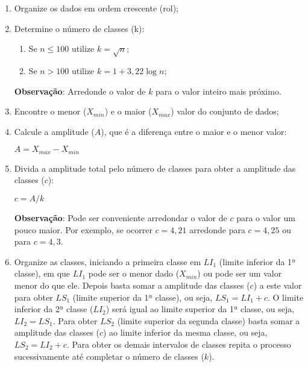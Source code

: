 \documentclass[11pt,fleqn]{book} %
\begin{document}
\begin{enumerate}
	\item Organize os dados em ordem crescente (rol); \\
	
	\item{Determine o número de classes (k):	
	\begin{enumerate}
		\item Se $n \leq 100$ utilize $k=\sqrt{n}$;
		\item Se $n>100$ utilize $k = 1+3,22 \log{n}$;
	\end{enumerate}
	{\bf Observação}: Arredonde o valor de $k$ para o valor inteiro mais próximo. \\
		}
		
	\item Encontre o menor ($X_{min}$) e o maior ($X_{max}$) valor do conjunto de dados; \\
	
	\item Calcule a amplitude ($A$), que é a diferença entre o maior e o menor valor:
	\begin{center}
	$A = X_{max}-X_{min}$
	\end{center}
	
	\item Divida a amplitude total pelo número de classes para obter a amplitude das classes ($c$):
	\begin{center}
	$c=A/k$
	\end{center}
	{\bf Observação}: Pode ser conveniente arredondar o valor de $c$ para o valor um pouco maior. 
	Por exemplo, se ocorrer $c=4,21$ arredonde para $c=4,25$ ou para $c=4,3$. \\
	
	\item Organize as classes, iniciando a primeira classe em $LI_1$ (limite inferior da 1ª classe), em que $LI_1$ pode ser o menor dado ($X_{min}$) ou pode ser um valor menor do que ele. Depois basta somar a amplitude das classes ($c$) a este valor para obter $LS_1$ (limite superior da 1ª classe), ou seja, $LS_1=LI_1+c$. O limite inferior da 2ª classe ($LI_2$) será igual ao limite superior da 1ª classe, ou seja, $LI_2=LS_1$. Para obter $LS_2$ (limite superior da segunda classe) basta somar a amplitude das classes ($c$) ao limite inferior da mesma classe, ou seja, $LS_2=LI_2+c$. Para obter os demais intervalos de classes repita o processo sucessivamente até completar o número de classes ($k$). \\
	

\end{enumerate}
\end{document}
